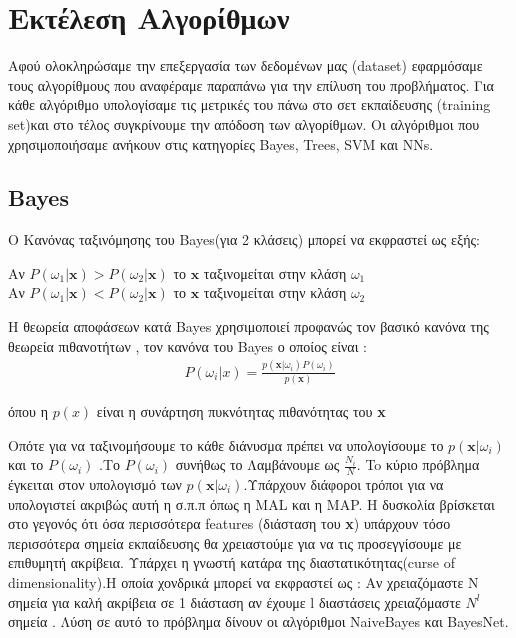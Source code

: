 \chapter{Εκτέλεση Αλγορίθμων}


Αφού ολοκληρώσαμε την επεξεργασία των δεδομένων μας (dataset) εφαρμόσαμε τους αλγορίθμους που αναφέραμε παραπάνω για την επίλυση του προβλήματος. Για κάθε αλγόριθμο υπολογίσαμε τις μετρικές του πάνω στο σετ εκπαίδευσης (training set)και στο τέλος συγκρίνουμε την απόδοση των αλγορίθμων. Οι αλγόριθμοι που χρησιμοποιήσαμε ανήκουν στις κατηγορίες Bayes, Trees, SVM και NNs.


\section{Bayes}
O Κανόνας ταξινόμησης του Βayes(για 2 κλάσεις) μπορεί να εκφραστεί ως εξής:\\
\begin{center}
Αν $P(\omega_1|\mathbf{x}) > P(\omega_2|\mathbf{x})$ το $\mathbf{x} $ ταξινομείται στην κλάση 
$\omega_1$\\
Αν $P(\omega_1|\mathbf{x}) < P(\omega_2|\mathbf{x})$ το $\mathbf{x} $ ταξινομείται στην κλάση 
$\omega_2$
\end{center}

Η θεωρεία αποφάσεων κατά Bayes χρησιμοποιεί προφανώς  τον βασικό κανόνα της θεωρεία πιθανοτήτων , 
τον κανόνα του Bayes ο οποίος είναι : 
\begin{align*}
P(\omega_i|x) = \frac{p(\mathbf{x}|\omega_i)P(\omega_i)}{p(\mathbf{x})}
\end{align*}

\begin{center}
όπου η $p(x)$ είναι η συνάρτηση πυκνότητας πιθανότητας του  \textbf{x} 
\end{center}

Οπότε για να ταξινομήσουμε το κάθε διάνυσμα πρέπει να υπολογίσουμε το $p(\mathbf{x}|\omega_i)$ και το
 $P(\omega_i) $ .Το $ P(\omega_i)$ συνήθως το Λαμβάνουμε ως $\frac{N_i}{N}$. To κύριο πρόβλημα έγκειται
στον υπολογισμό των $p(\mathbf{x}|\omega_i)$.Υπάρχουν διάφοροι τρόποι για να υπολογιστεί ακριβώς
 αυτή  η σ.π.π όπως η MAL και η  MAP. Η δυσκολία βρίσκεται στο γεγονός ότι όσα περισσότερα features
 (διάσταση του  \textbf{x}) υπάρχουν τόσο περισσότερα σημεία εκπαίδευσης θα χρειαστούμε για να τις 
 προσεγγίσουμε με επιθυμητή ακρίβεια. Υπάρχει η γνωστή κατάρα της διαστατικότητας(curse of 
 dimensionality).Η οποία χονδρικά μπορεί να εκφραστεί ως : Αν χρειαζόμαστε Ν σημεία για καλή ακρίβεια σε 
 1 διάσταση αν έχουμε l διαστάσεις χρειαζόμαστε $N^l$ σημεία . Λύση  σε αυτό το πρόβλημα δίνουν οι 
 αλγόριθμοι NaiveBayes και BayesNet.
 
